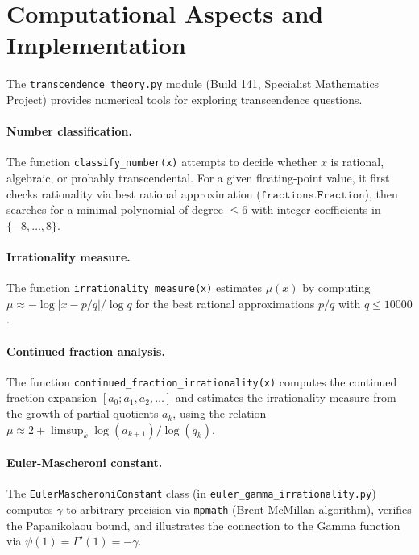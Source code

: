 \documentclass[12pt,a4paper]{amsart}
\theoremstyle{definition}
\begin{document}
\section{Computational Aspects and Implementation}
\label{sec:computational}

The \texttt{transcendence\_theory.py} module (Build 141, Specialist Mathematics
Project) provides numerical tools for exploring transcendence questions.

\paragraph{Number classification.}
The function \texttt{classify\_number(x)} attempts to decide whether $x$ is
rational, algebraic, or probably transcendental. For a given floating-point
value, it first checks rationality via best rational approximation
($\texttt{fractions.Fraction}$), then searches for a minimal polynomial
of degree $\leq 6$ with integer coefficients in $\{-8, \ldots, 8\}$.

\paragraph{Irrationality measure.}
The function \texttt{irrationality\_measure(x)} estimates $\mu(x)$ by computing
$\mu \approx -\log|x - p/q|/\log q$ for the best rational approximations $p/q$
with $q \leq 10000$.

\paragraph{Continued fraction analysis.}
The function \texttt{continued\_fraction\_irrationality(x)} computes the
continued fraction expansion $[a_0; a_1, a_2, \ldots]$ and estimates the
irrationality measure from the growth of partial quotients $a_k$, using the
relation $\mu \approx 2 + \limsup_k \log(a_{k+1})/\log(q_k)$.

\paragraph{Euler-Mascheroni constant.}
The \texttt{EulerMascheroniConstant} class (in
\texttt{euler\_gamma\_irrationality.py}) computes $\gamma$ to arbitrary
precision via \texttt{mpmath} (Brent-McMillan algorithm), verifies the
Papanikolaou bound, and illustrates the connection to the Gamma function
via $\psi(1) = \Gamma'(1) = -\gamma$.
\end{document}
